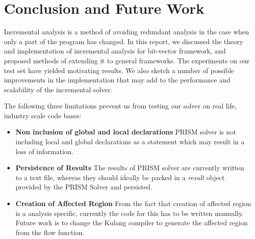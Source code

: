 \documentclass[11pt,a4paper,openright]{report}
\begin{document}
\chapter{Conclusion and Future Work}
%  
% 
% 
Incremental analysis is a method of avoiding redundant analysis in the case when only a part of the program has changed.
In this report, we discussed the theory and implementation of incremental analysis for bit-vector framework, and 
proposed methods of extending it to general frameworks. The experiments on our test set have yielded motivating results.
We also sketch a number of possible improvements in the implementation that may add to the performance and scalability of
the incremental solver.


The following three limitations prevent us from testing our solver on real life, industry scale code bases:
\begin{itemize}

 \item \textbf{Non inclusion of global and local declarations} PRISM solver is not including local and global declarations as a statement which may result in
 a loss of information.
 \item \textbf{Persistence of Results} The results of PRISM solver are currently written to a text file, whereas they should 
 ideally be packed in a \emph{result} object provided by the PRISM Solver and persisted.
 \item \textbf{Creation of Affected Region} From the fact that creation of affected region is a analysis specific, currently the code for this has to be written manually.
 Future work is to change the Kulang compiler to generate the affected region from the flow function.
 
\end{itemize}
\end{document}
